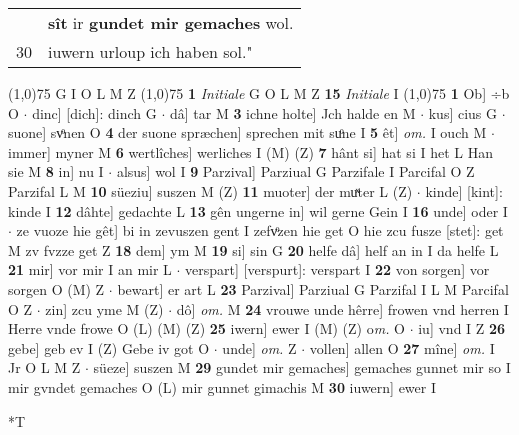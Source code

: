 \documentclass[8pt,a4paper,notitlepage]{article}
\begin{document}
\begin{table}[ht]
\begin{minipage}[t]{0.5\linewidth}
\begin{tabular}{rl}
 & \textbf{sît} ir \textbf{gundet mir gemaches} wol.\\ 
30 & iuwern urloup ich haben sol."\\ 
\end{tabular}
\scriptsize
\line(1,0){75} \newline
G I O L M Z \newline
\line(1,0){75} \newline
\textbf{1} \textit{Initiale} G O L M Z  \textbf{15} \textit{Initiale} I  \newline
\line(1,0){75} \newline
\textbf{1} Ob] ÷b O  $\cdot$ dinc] [dich]: dinch G  $\cdot$ dâ] tar M \textbf{3} ichne holte] Jch halde en M  $\cdot$ kus] cius G  $\cdot$ suone] svͦnen O \textbf{4} der suone spræchen] sprechen mit suͦne I \textbf{5} êt] \textit{om.} I ouch M  $\cdot$ immer] myner M \textbf{6} wertlîches] werliches I (M) (Z) \textbf{7} hânt si] hat si I het L Han sie M \textbf{8} in] nu I  $\cdot$ alsus] wol I \textbf{9} Parzival] Parziual G Parzifale I Parcifal O Z Parzifal L M \textbf{10} süeziu] suszen M (Z) \textbf{11} muoter] der muͯter L (Z)  $\cdot$ kinde] [kint]: kinde I \textbf{12} dâhte] gedachte L \textbf{13} gên ungerne in] wil gerne Gein I \textbf{16} unde] oder I  $\cdot$ ze vuoze hie gêt] bi in zevuszen gent I zefvͦzen hie get O hie zcu fusze [stet]: get M zv fvzze get Z \textbf{18} dem] ym M \textbf{19} si] sin G \textbf{20} helfe dâ] helf an in I da helfe L \textbf{21} mir] vor mir I an mir L  $\cdot$ verspart] [verspurt]: verspart I \textbf{22} von sorgen] vor sorgen O (M) Z  $\cdot$ bewart] er art L \textbf{23} Parzival] Parziual G Parzifal I L M Parcifal O Z  $\cdot$ zin] zcu yme M (Z)  $\cdot$ dô] \textit{om.} M \textbf{24} vrouwe unde hêrre] frowen vnd herren I Herre vnde frowe O (L) (M) (Z) \textbf{25} iwern] ewer I (M) (Z) o\textit{m. } O  $\cdot$ iu] vnd I Z \textbf{26} gebe] geb ev I (Z) Gebe iv got O  $\cdot$ unde] \textit{om.} Z  $\cdot$ vollen] allen O \textbf{27} mîne] \textit{om.} I Jr O L M Z  $\cdot$ süeze] suszen M \textbf{29} gundet mir gemaches] gemaches gunnet mir so I mir gvndet gemaches O (L) mir gunnet gimachis M \textbf{30} iuwern] ewer I \newline
\end{minipage}
\hspace{0.5cm}
\begin{minipage}[t]{0.5\linewidth}
\small
\begin{center}*T
\end{center}
\begin{tabular}{rl}

\end{tabular}
\end{minipage}
\end{table}
\end{document}
